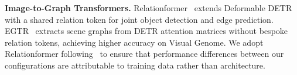 \noindent\textbf{Image-to-Graph Transformers.}
Relationformer~\cite{shit2022} extends Deformable DETR~\cite{zhu2021}
with a shared relation token for joint object detection and edge
prediction.
EGTR~\cite{im2024} extracts scene graphs from DETR attention matrices
without bespoke relation tokens, achieving higher accuracy on Visual
Genome.
We adopt Relationformer following~\cite{sturmer2025} to ensure that
performance differences between our configurations are attributable to
training data rather than architecture.
